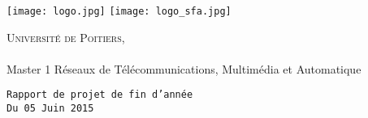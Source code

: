 


\begin{titlepage}
\begin{center}
\texttt{[image: logo.jpg]} %
\hfill%
\texttt{[image: logo\_sfa.jpg]}\\
\end{center}
\vspace*{1cm}



\begin{center}
\textsc{Universit\'e de Poitiers,}\paragraph{}
 Master 1 Réseaux de Télécommunications, Multimédia et Automatique
\end{center}


\begin{center}
\texttt{Rapport de projet de fin d'année\\
Du 05 Juin 2015} %
\end{center}
\vspace*{2cm}
 
 
\begin{center}
\setlength{\fboxsep}{4mm}
\setlength{\fboxrule}{1mm}
\end{center}




\end{titlepage}
